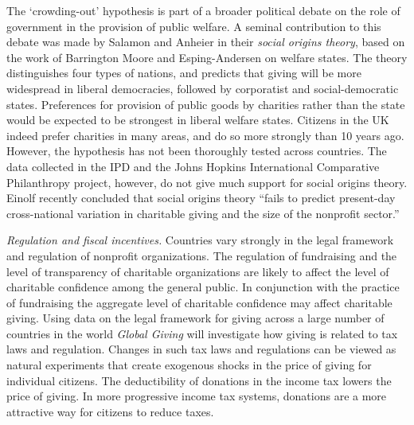 \documentclass[twocolumn, serif, rga, numeric]{jote-article}
\begin{document}
The `crowding-out' hypothesis is part of a broader political debate on the role of government in the provision of public welfare. A seminal contribution to this debate was made by Salamon and Anheier in their \emph{social origins theory}\cite{Salomon1998}, based on the work of Barrington Moore\cite{Moore1966} and Esping-Andersen on welfare states.\cite{EspingAndersen1990} The theory distinguishes four types of nations, and predicts that giving will be more widespread in liberal democracies, followed by corporatist and social-democratic states. Preferences for provision of public goods by charities rather than the state would be expected to be strongest in liberal welfare states. Citizens in the UK indeed prefer charities in many areas, and do so more strongly than 10 years ago.\cite{Mohan2016} However, the hypothesis has not been thoroughly tested across countries. The data collected in the IPD and the Johns Hopkins International Comparative Philanthropy project, however, do not give much support for social origins theory. Einolf recently concluded that social origins theory ``fails to predict present-day cross-national variation in charitable giving and the size of the nonprofit sector.''\cite{Einolf2015}

\emph{Regulation and fiscal incentives.} Countries vary strongly in the legal framework and regulation of nonprofit organizations.\cite{Breeze2015, Dehne2008, -91} The regulation of fundraising and the level of transparency of charitable organizations are likely to affect the level of charitable confidence among the general public.\cite{Bekkers2003} In conjunction with the practice of fundraising the aggregate level of charitable confidence may affect charitable giving.\cite{Breeze2015} Using data on the legal framework for giving across a large number of countries in the world \emph{Global Giving} will investigate how giving is related to tax laws and regulation.\cite{Quick2014} Changes in such tax laws and regulations can be viewed as natural experiments\cite{Hertwig2001, -121} that create exogenous shocks in the price of giving for individual citizens. The deductibility of donations in the income tax lowers the price of giving. In more progressive income tax systems, donations are a more attractive way for citizens to reduce taxes.
\end{document}
